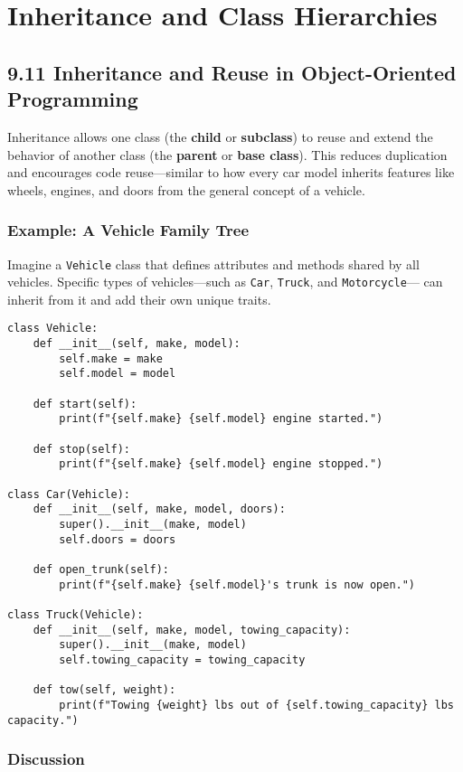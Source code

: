 \chapter{Inheritance and Class Hierarchies}

\section*{9.11 Inheritance and Reuse in Object-Oriented Programming}

Inheritance allows one class (the \textbf{child} or \textbf{subclass}) to reuse and extend the
behavior of another class (the \textbf{parent} or \textbf{base class}). This reduces
duplication and encourages code reuse—similar to how every car model inherits features
like wheels, engines, and doors from the general concept of a vehicle.

\subsection*{Example: A Vehicle Family Tree}

Imagine a \texttt{Vehicle} class that defines attributes and methods shared by all vehicles.
Specific types of vehicles—such as \texttt{Car}, \texttt{Truck}, and \texttt{Motorcycle}—
can inherit from it and add their own unique traits.

\begin{verbatim}
class Vehicle:
    def __init__(self, make, model):
        self.make = make
        self.model = model
    
    def start(self):
        print(f"{self.make} {self.model} engine started.")
    
    def stop(self):
        print(f"{self.make} {self.model} engine stopped.")

class Car(Vehicle):
    def __init__(self, make, model, doors):
        super().__init__(make, model)
        self.doors = doors
    
    def open_trunk(self):
        print(f"{self.make} {self.model}'s trunk is now open.")

class Truck(Vehicle):
    def __init__(self, make, model, towing_capacity):
        super().__init__(make, model)
        self.towing_capacity = towing_capacity
    
    def tow(self, weight):
        print(f"Towing {weight} lbs out of {self.towing_capacity} lbs capacity.")
\end{verbatim}

\subsection*{Discussion}

